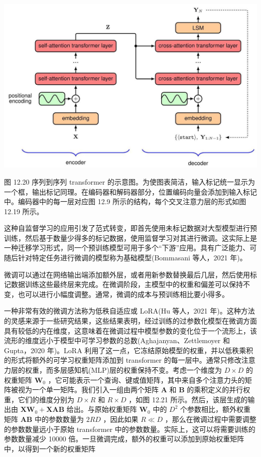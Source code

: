 \documentclass[10pt]{report}
\begin{document}
\begin{center}
\includegraphics[max width=1.0\textwidth]{images/0194e279-9b28-703a-88f4-c3ac21e2010d_411_297_354_1245_807_0.jpg}
\end{center}
\hspace*{3em} 

图 12.20 序列到序列 transformer 的示意图。为使图表简洁，输入标记统一显示为一个框，输出标记同理。在编码器和解码器部分，位置编码向量会添加到输入标记中。编码器中的每一层对应图 12.9 所示的结构，每个交叉注意力层的形式如图 12.19 所示。

这种自监督学习的应用引发了范式转变，即首先使用未标记数据对大型模型进行预训练，然后基于数量少得多的标记数据，使用监督学习对其进行微调。这实际上是一种迁移学习形式，同一个预训练模型可用于多个“下游”应用。具有广泛能力、可随后针对特定任务进行微调的模型称为基础模型(Bommasani 等人，2021 年)。

微调可以通过在网络输出端添加额外层，或者用新参数替换最后几层，然后使用标记数据训练这些最终层来完成。在微调阶段，主模型中的权重和偏差可以保持不变，也可以进行小幅度调整。通常，微调的成本与预训练相比要小得多。

一种非常有效的微调方法称为低秩自适应或 LoRA(Hu 等人，2021 年)。这种方法的灵感来源于一些研究结果，这些结果表明，经过训练的过参数化模型在微调方面具有较低的内在维度，这意味着在微调过程中模型参数的变化位于一个流形上，该流形的维度远小于模型中可学习参数的总数(Aghajanyan、Zettlemoyer 和 Gupta，2020 年)。LoRA 利用了这一点，它冻结原始模型的权重，并以低秩乘积的形式将额外的可学习权重矩阵添加到 transformer 的每一层中。通常只修改注意力层的权重，而多层感知机(MLP)层的权重保持不变。考虑一个维度为 \(D \times  D\) 的权重矩阵 \({\mathbf{W}}_{0}\) ，它可能表示一个查询、键或值矩阵，其中来自多个注意力头的矩阵被视为一个单一矩阵。我们引入一组由两个矩阵 \(\mathbf{A}\) 和 \(\mathbf{B}\) 的乘积定义的并行权重，它们的维度分别为 \(D \times  R\) 和 \(R \times  D\) ，如图 12.21 所示。然后，该层生成的输出由 \({\mathbf{{XW}}}_{0} + \mathbf{{XAB}}\) 给出。与原始权重矩阵 \({\mathbf{W}}_{0}\) 中的 \({D}^{2}\) 个参数相比，额外权重矩阵 \(\mathbf{{AB}}\) 中的参数数量为 \({2RD}\) ，因此如果 \(R \ll  D\) ，那么在微调过程中需要调整的参数数量远小于原始 transformer 中的参数数量。实际上，这可以将需要训练的参数数量减少 10000 倍。一旦微调完成，额外的权重可以添加到原始权重矩阵中，以得到一个新的权重矩阵
\end{document}
